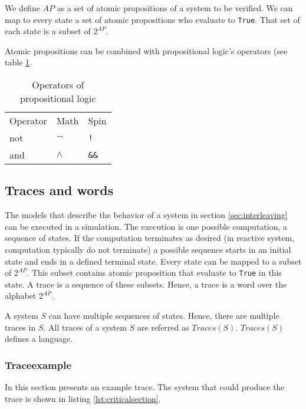 \documentclass[a4paper, twoside]{article}
\begin{document}
We define $AP$ as a set of atomic propositions of a system to be verified. We can map to every state a set of atomic propositions who evaluate to \verb|True|. That set of each state is a subset of $2^{AP}$.

Atomic propositions can be combined with propositional logic's operators (see table \ref{tab:operators_of_propositionallogic}.

\begin{table}[h]
  \centering

  \begin{tabular}{l l l}
    Operator & Math & Spin \\
    not & $\neg$ & \verb|!| \\
    and & $\land$ & \verb|&&| \\
  \end{tabular}
  \caption{Operators of propositional logic }
  \label{tab:operators_of_propositionallogic}
\end{table}

\subsection{Traces and words}
\label{sec:traces}

The models that describe the behavior of a system in section \ref{sec:interleaving} can be executed in a simulation. The execution is one possible computation, a sequence of states. If the computation terminates as desired (in reactive system, computation typically do not terminate) a possible sequence starts in an initial state and ends in a defined terminal state. Every state can be mapped to a subset of $2^{AP}$. This subset contains atomic proposition that evaluate to \verb|True| in this state. A trace is a sequence of these subsets. Hence, a trace is a word over the alphabet $2^{AP}$.

A system $S$ can have multiple sequences of states. Hence, there are multiple traces in $S$. All traces of a system $S$ are referred as $Traces(S)$. $Traces(S)$ defines a language.

\subsubsection{Traceexample}
\label{sec:traceexample}

In this section presents an example trace. The system that could produce the trace is shown in listing \ref{lst:criticalsection}.


\end{document}
